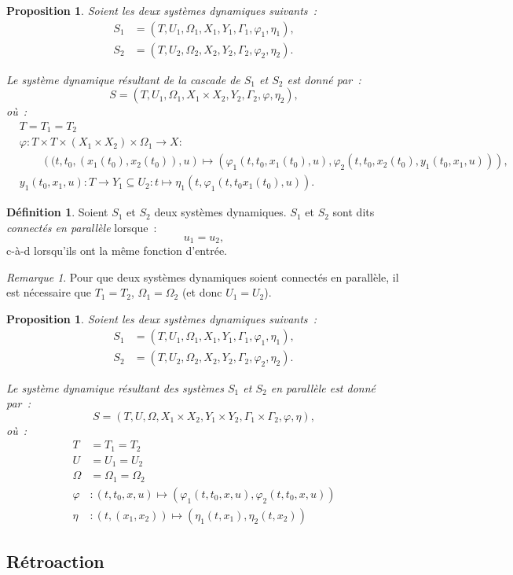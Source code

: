 \documentclass{article}
\newtheorem{prp}[thm]{Proposition}
\theoremstyle{definition}
\newtheorem{déf}[thm]{Définition}
\theoremstyle{remark}
\newtheorem*{rmq}{Remarque}
\begin{document}
	\begin{prp} Soient les deux systèmes dynamiques suivants~:
	\begin{align*}
		S_1 &= \left(T, U_1, \Omega_1, X_1, Y_1, \Gamma_1, \varphi_1, \eta_1\right), \\
		S_2 &= \left(T, U_2, \Omega_2, X_2, Y_2, \Gamma_2, \varphi_2, \eta_2\right).
	\end{align*}

	Le système dynamique résultant de la cascade de $S_1$ et $S_2$ est donné par~:
	\[S = \left(T, U_1, \Omega_1, X_1 \times X_2, Y_2, \Gamma_2, \varphi, \eta_2\right),\]
	où~:
	\begin{align*}
		&T = T_1 = T_2 \\
		&\varphi : T \times T \times (X_1 \times X_2) \times \Omega_1 \to X : \\
		&\qquad\left((t, t_0, \left(x_1(t_0), x_2(t_0)\right), u\right) \mapsto
				\left(\varphi_1\left(t, t_0, x_1(t_0), u\right), \varphi_2\left(t, t_0, x_2(t_0), y_1(t_0, x_1, u)\right)\right), \\
		&y_1(t_0, x_1, u) : T \to Y_1 \subseteq U_2 : t \mapsto \eta_1\left(t, \varphi_1\left(t, t_0 x_1(t_0), u\right)\right).
	\end{align*}
	\end{prp}

	\begin{déf} Soient $S_1$ et $S_2$ deux systèmes dynamiques. $S_1$ et $S_2$ sont dits \textit{connectés en parallèle} lorsque~:
	\[u_1 = u_2,\]
	c-à-d lorsqu'ils ont la même fonction d'entrée.
	\end{déf}

	\begin{rmq} Pour que deux systèmes dynamiques soient connectés en parallèle, il est nécessaire que $T_1 = T_2$, $\Omega_1 = \Omega_2$ (et donc $U_1 = U_2$).
	\end{rmq}

	\begin{prp} Soient les deux systèmes dynamiques suivants~:
	\begin{align*}
		S_1 &= \left(T, U_1, \Omega_1, X_1, Y_1, \Gamma_1, \varphi_1, \eta_1\right), \\
		S_2 &= \left(T, U_2, \Omega_2, X_2, Y_2, \Gamma_2, \varphi_2, \eta_2\right).
	\end{align*}

	Le système dynamique résultant des systèmes $S_1$ et $S_2$ en parallèle est donné par~:
	\[S = \left(T, U, \Omega, X_1 \times X_2, Y_1 \times Y_2, \Gamma_1 \times \Gamma_2, \varphi, \eta\right),\]
	où~:
	\begin{align*}
		T &= T_1 = T_2 \\
		U &= U_1 = U_2 \\
		\Omega &= \Omega_1 = \Omega_2 \\
		\varphi &: (t, t_0, x, u) \mapsto \left(\varphi_1(t, t_0, x, u), \varphi_2(t, t_0, x, u)\right) \\
		\eta &: \left(t, (x_1, x_2)\right) \mapsto \left(\eta_1(t, x_1), \eta_2(t, x_2)\right)
	\end{align*}
	\end{prp}

	\subsection{Rétroaction}
\end{document}
